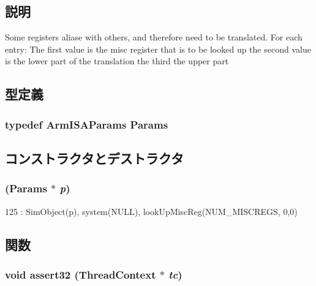 \subsection{説明}
Some registers aliase with others, and therefore need to be translated. For each entry: The first value is the misc register that is to be looked up the second value is the lower part of the translation the third the upper part 

\subsection{型定義}
\hypertarget{structArmISA_1_1ISA_a44000e19d886af0a346cd5a03302d3b6}{
\subsubsection[{Params}]{\setlength{\rightskip}{0pt plus 5cm}typedef ArmISAParams {\bf Params}}}
\label{structArmISA_1_1ISA_a44000e19d886af0a346cd5a03302d3b6}


\subsection{コンストラクタとデストラクタ}
\hypertarget{structArmISA_1_1ISA_ae9132e021b3f3b20c917fc328a056bbd}{
\subsubsection[{ISA}]{ ({\bf Params} $\ast$ {\em p})}}
\label{structArmISA_1_1ISA_ae9132e021b3f3b20c917fc328a056bbd}



\begin{DoxyCode}
125     : SimObject(p), system(NULL), lookUpMiscReg(NUM_MISCREGS, {0,0})
\end{DoxyCode}


\subsection{関数}
\hypertarget{structArmISA_1_1ISA_aa4f7032f366383d3b3696a1d0f5410a2}{
\subsubsection[{assert32}]{\setlength{\rightskip}{0pt plus 5cm}void assert32 ({\bf ThreadContext} $\ast$ {\em tc})}}
\label{structArmISA_1_1ISA_aa4f7032f366383d3b3696a1d0f5410a2}



